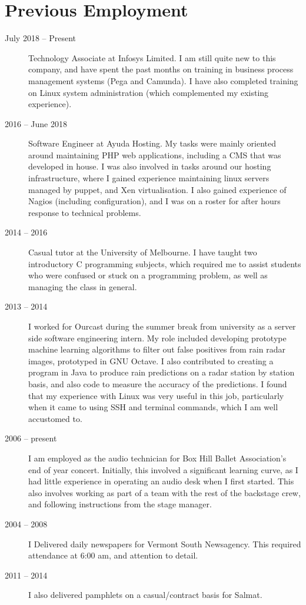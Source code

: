 \documentclass[a4paper]{article}
\begin{document}
\section{Previous Employment}
\begin{description}
    \item[July 2018 -- Present] Technology Associate at Infosys Limited.
        I am still quite new to this company, and have spent the past
        months on training in business process management systems (Pega
        and Camunda). I have also completed training on Linux system
        administration (which complemented my existing experience).
    \item[2016 -- June 2018] Software Engineer at Ayuda Hosting. My tasks
        were mainly oriented around maintaining PHP web applications,
        including a CMS that was developed in house. I was also involved in
        tasks around our hosting infrastructure, where I gained
        experience maintaining linux servers managed by puppet, and Xen
        virtualisation. I also gained experience of Nagios (including configuration), and I was
        on a roster for after hours response to technical problems.
    \item[2014 -- 2016] Casual tutor at the University of Melbourne. I
        have taught two introductory C programming subjects, which required
        me to assist students who were confused or stuck on a programming
        problem, as well as managing the class in general.
    \item[2013 -- 2014] I worked for Ourcast during the summer break from
        university as a server side software engineering intern. My role
        included developing prototype machine learning algorithms to filter
        out false positives from rain radar images, prototyped in GNU 
        Octave. I also contributed to creating a program in Java to produce
        rain predictions on a radar station by station basis, and also code
        to measure the accuracy of the predictions. I found that my
        experience with Linux was very useful in this job, particularly when
        it came to using SSH and terminal commands, which I am well accustomed
        to.
    \item[2006 -- present] I am employed as the audio technician for Box
        Hill Ballet Association's end of year concert. Initially, this 
        involved a significant learning curve, as I had little experience 
        in operating an audio desk when I first started. This also involves 
        working as part of a team with the rest of the backstage crew, and
        following instructions from the stage manager.
    \item[2004 -- 2008] I Delivered daily newspapers for Vermont South
        Newsagency. This required attendance at 6:00 am, and attention to
        detail.
    \item[2011 -- 2014] I also delivered pamphlets on a casual/contract
        basis for Salmat.
\end{description}
\end{document}
